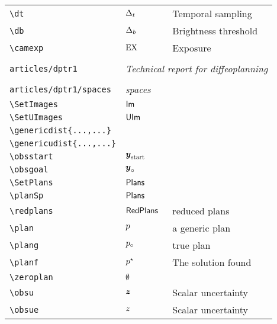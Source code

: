 \begin{longtable}{lll}
 {\color[rgb]{0.5,0.5,0.5}\texttt{\textbackslash dt}} & $\Delta_t$ &  Temporal sampling\\ 
 {\color[rgb]{0.5,0.5,0.5}\texttt{\textbackslash db}} & $\Delta_b$ &  Brightness threshold\\ 
 {\color[rgb]{0.5,0.5,0.5}\texttt{\textbackslash camexp}} & $\text{EX}$ &  Exposure\\ 
  &  & \\ 
 {\color[rgb]{0.5,0.5,0.5}\texttt{articles/dptr1}} & \multicolumn{2}{l}{\emph{Technical report for diffeoplanning}}\\ 
 \hline
 &  & \\ 
 {\color[rgb]{0.5,0.5,0.5}\texttt{articles/dptr1/spaces}} & \multicolumn{2}{l}{\emph{spaces}}\\ 
 \hline
{\color[rgb]{0.5,0.5,0.5}\texttt{\textbackslash SetImages}} & $\mathsf{Im}$ & \\ 
 {\color[rgb]{0.5,0.5,0.5}\texttt{\textbackslash SetUImages}} & $\mathsf{UIm}$ & \\ 
 {\color[rgb]{0.5,0.5,0.5}\texttt{\textbackslash genericdist\{...,...\}}} &  & \\ 
 {\color[rgb]{0.5,0.5,0.5}\texttt{\textbackslash genericudist\{...,...\}}} &  & \\ 
 {\color[rgb]{0.5,0.5,0.5}\texttt{\textbackslash obsstart}} & $\boldsymbol{y}_{\text{start}}$ & \\ 
 {\color[rgb]{0.5,0.5,0.5}\texttt{\textbackslash obsgoal}} & $\boldsymbol{y}_{\circ}$ & \\ 
 {\color[rgb]{0.5,0.5,0.5}\texttt{\textbackslash SetPlans}} & $\mathsf{Plans}$ & \\ 
 {\color[rgb]{0.5,0.5,0.5}\texttt{\textbackslash planSp}} & $\mathsf{Plans}$ & \\ 
 {\color[rgb]{0.5,0.5,0.5}\texttt{\textbackslash redplans}} & $\mathsf{RedPlans}$ &  reduced plans\\ 
 {\color[rgb]{0.5,0.5,0.5}\texttt{\textbackslash plan}} & $p$ &  a generic plan\\ 
 {\color[rgb]{0.5,0.5,0.5}\texttt{\textbackslash plang}} & $p_{\circ}$ &  true plan\\ 
 {\color[rgb]{0.5,0.5,0.5}\texttt{\textbackslash planf}} & $p^\star$ &  The solution found \\ 
 {\color[rgb]{0.5,0.5,0.5}\texttt{\textbackslash zeroplan}} & $\emptyset$ & \\ 
 {\color[rgb]{0.5,0.5,0.5}\texttt{\textbackslash obsu}} & $\boldsymbol{z}$ &  Scalar uncertainty\\ 
 {\color[rgb]{0.5,0.5,0.5}\texttt{\textbackslash obsue}} & $z$ &  Scalar uncertainty\\ 

\end{longtable}
